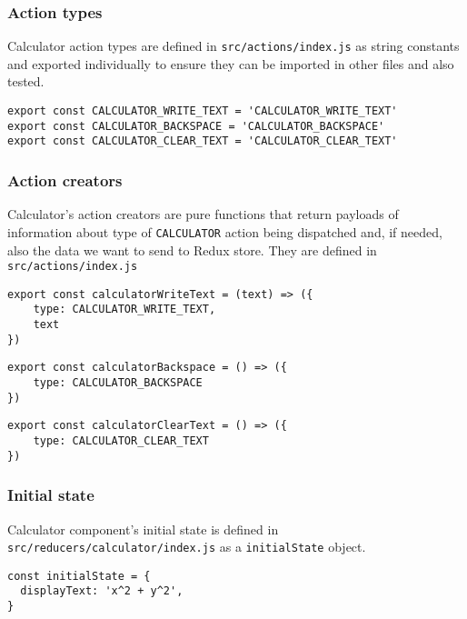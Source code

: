 \subsubsection{Action types}
Calculator action types are defined in \texttt{src/actions/index.js} as string constants and exported individually to ensure they can be imported in other files and also tested.

\begin{lstlisting}[caption={\texttt{calculator} action types.},captionpos=b]
export const CALCULATOR_WRITE_TEXT = 'CALCULATOR_WRITE_TEXT'
export const CALCULATOR_BACKSPACE = 'CALCULATOR_BACKSPACE'
export const CALCULATOR_CLEAR_TEXT = 'CALCULATOR_CLEAR_TEXT'
\end{lstlisting}

\subsubsection{Action creators}
Calculator's action creators are pure functions that return payloads of information about type of \texttt{CALCULATOR} action being dispatched and, if needed, also the data we want to send to Redux store. They are defined in \texttt{src/actions/index.js}

\begin{lstlisting}[caption={Action for writing text to calculator display.},captionpos=b]
export const calculatorWriteText = (text) => ({
    type: CALCULATOR_WRITE_TEXT,
    text
})
\end{lstlisting}

\begin{lstlisting}[caption={Action to remove character from calculator display.},captionpos=b]
export const calculatorBackspace = () => ({
    type: CALCULATOR_BACKSPACE
})
\end{lstlisting}

\begin{lstlisting}[caption={Action to completely clear the calculator display.},captionpos=b]
export const calculatorClearText = () => ({
    type: CALCULATOR_CLEAR_TEXT
})
\end{lstlisting}

\subsubsection{Initial state}
Calculator component's initial state is defined in \texttt{src/reducers/calculator/index.js} as a \texttt{initialState} object.

\begin{lstlisting}[caption={Initial state of a \textsl{calculator}.},captionpos=b]
const initialState = {
  displayText: 'x^2 + y^2',
}
\end{lstlisting}

